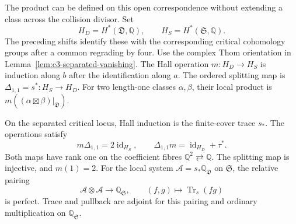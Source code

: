 The product can be defined on this open correspondence without
extending a class across the collision divisor. Set
\[
 H_D=H^*(\mathfrak D,\mathbb Q),\qquad
 H_S=H^*(\mathfrak S,\mathbb Q).
\]
The preceding shifts identify these with the corresponding critical
cohomology groups after a common regrading by four.
Use the complex Thom orientation in
Lemma~\ref{lem:c3-separated-vanishing}. The Hall operation $m:H_D\to H_S$
is induction along $b$ after the identification along $a$.
The ordered splitting map is $\Delta_{1,1}=s^*:H_S\to H_D$.
For two length-one classes $\alpha,\beta$, their local product is
$m((\alpha\boxtimes\beta)|_{\mathfrak D})$.

\begin{theorem}
\label{thm:c3-separated-hall}
On the separated critical locus, Hall induction is the finite-cover
trace $s_*$. The operations satisfy
\begin{equation}
 m\Delta_{1,1}=2\operatorname{id}_{H_S},\qquad
 \Delta_{1,1}m=\operatorname{id}_{H_D}+\tau^*.
 \label{eq:c3-separated-mackey}
\end{equation}
Both maps have rank one on the coefficient fibres
$\mathbb Q^2\rightleftarrows\mathbb Q$.
The splitting map is injective, and $m(1)=2$.
For the local system $\mathcal A=s_*\mathbb Q_{\mathfrak D}$ on
$\mathfrak S$, the relative pairing
\[
 \mathcal A\otimes\mathcal A\longrightarrow\mathbb Q_{\mathfrak S},
 \qquad (f,g)\longmapsto\operatorname{Tr}_s(fg)
\]
is perfect. Trace and pullback are adjoint for this pairing and
ordinary multiplication on $\mathbb Q_{\mathfrak S}$.
\end{theorem}

